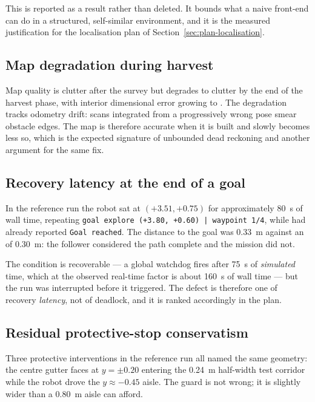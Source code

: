 \documentclass[conference]{IEEEtran}
\begin{document}
This is reported as a result rather than deleted. It bounds what a naive
front-end can do in a structured, self-similar environment, and it is the
measured justification for the localisation plan of
Section~\ref{sec:plan-localisation}.

\subsection{Map degradation during harvest}

Map quality is  clutter after the survey but degrades to
 clutter by the end of the harvest phase, with interior
dimensional error growing to . The degradation tracks
odometry drift: scans integrated from a progressively wrong pose smear
obstacle edges. The map is therefore accurate when it is built and slowly
becomes less so, which is the expected signature of unbounded dead reckoning
and another argument for the same fix.

\subsection{Recovery latency at the end of a goal}

In the reference run the robot sat at $(+3.51, +0.75)$ for approximately
\SI{80}{s} of wall time, repeating \texttt{goal explore (+3.80, +0.60) |
waypoint 1/4}, while  had already reported
\texttt{Goal reached}. The distance to the goal was \SI{0.33}{m} against an
 of \SI{0.30}{m}: the follower considered the path
complete and the mission did not.

The condition is recoverable --- a global watchdog fires after \SI{75}{s} of
\emph{simulated} time, which at the observed real-time factor is about
\SI{160}{s} of wall time --- but the run was interrupted before it triggered.
The defect is therefore one of recovery \emph{latency}, not of deadlock, and
it is ranked accordingly in the plan.

\subsection{Residual protective-stop conservatism}

Three protective interventions in the reference run all named the same
geometry: the centre gutter faces at $y = \pm 0.20$ entering the
\SI{0.24}{m} half-width test corridor while the robot drove the $y \approx
-0.45$ aisle. The guard is not wrong; it is slightly wider than a
\SI{0.80}{m} aisle can afford.
\end{document}
